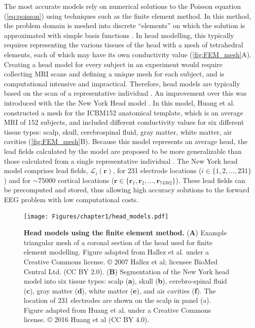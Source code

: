 The most accurate models rely on numerical solutions to the Poisson equation (\ref{eq:poisson}) using techniques such as the finite element method. In this method, the problem domain is meshed into discrete ``elements'' on which the solution is approximated with simple basis functions \cite{Liu2014}. In head modelling, this typically requires representing the various tissues of the head with a mesh of tetrahedral elements, each of which may have its own conductivity value \cite{Hallez2007} (\autoref{fig:FEM_mesh}{A}). Creating a head model for every subject in an experiment would require collecting MRI scans and defining a unique mesh for each subject, and is computational intensive and impractical. Therefore, head models are typically based on the scan of a representative individual \cite{Holmes1998}. An improvement over this was introduced with the the New York Head model \cite{Huang2016}. In this model, Huang et al. \cite{Huang2016} constructed a mesh for the ICBM152 anatomical template, which is an average MRI of 152 subjects, and included different conductivity values for six different tissue types: scalp, skull, cerebrospinal fluid, gray matter, white matter, air cavities (\autoref{fig:FEM_mesh}B). Because this model represents an average head, the lead fields calculated by the model are proposed to be more generalizable than those calculated from a single representative individual \cite{Huang2016}. The New York head model comprises lead fields, $\mathcal{L}_i(\bm{r})$, for 231 electrode locations ($i\in\{1,2,...,231\}$) and for  ${\sim}75000$ cortical locations ($\bm{r}\in\{ \bm{r}_1, \bm{r}_2, ..., \bm{r}_{74382} \}$). These lead fields can be precomputed and stored, thus allowing high accuracy solutions to the forward EEG problem with low computational costs.

\begin{figure}[t!]
    \centering
    \texttt{[image: Figures/chapter1/head\_models.pdf]}
    
    \caption{\textbf{Head models using the finite element method.} 
    (\textbf{A}) Example triangular mesh of a coronal section of the head used for finite element modelling. Figure adapted from Hallez et al. \cite{Hallez2007} under a Creative Commons license. © 2007 Hallez et al; licensee BioMed Central Ltd. (CC BY 2.0).
    (\textbf{B}) Segmentation of the New York head model into six tissue types: scalp (\textbf{a}), skull (\textbf{b}), cerebro-spinal fluid (\textbf{c}), gray matter (\textbf{d}), white matter (\textbf{e}), and air cavities (\textbf{f}). The location of 231 electrodes are shown on the scalp in panel (a). Figure adapted from Huang et al. \cite{Huang2016} under a Creative Commons license. © 2016 Huang et al (CC BY 4.0).
    } 
    \label{fig:FEM_mesh}
\end{figure}

